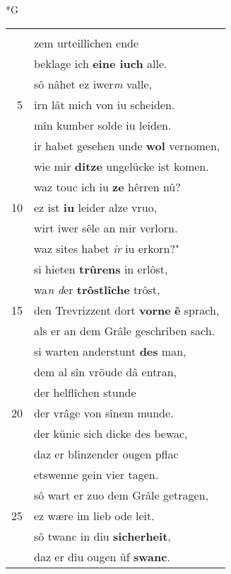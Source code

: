 \documentclass[8pt,a4paper,notitlepage]{article}
\begin{document}
\newpage
\begin{table}[ht]
\begin{minipage}[t]{0.5\linewidth}
\small
\begin{center}*G
\end{center}
\begin{tabular}{rl}
 & \textit{\begin{Large}I\end{Large}}ch vröuden ellende,\\ 
 & zem urteillîchen ende\\ 
 & beklage ich \textbf{eine iuch} alle.\\ 
 & sô nâhet ez iwer\textit{m} valle,\\ 
5 & irn lât mich von iu scheiden.\\ 
 & mîn kumber solde iu leiden.\\ 
 & ir habet gesehen unde \textbf{wol} vernomen,\\ 
 & wie mir \textbf{ditze} ungelücke ist komen.\\ 
 & waz touc ich iu \textbf{ze} hêrren nû?\\ 
10 & ez ist \textbf{iu} leider alze vruo,\\ 
 & wirt iwer sêle an mir verlorn.\\ 
 & waz sites habet \textit{ir} iu erkorn?"\\ 
 & si hieten \textbf{trûrens} in erlôst,\\ 
 & wa\textit{n d}er \textbf{trôstlîche} trôst,\\ 
15 & den Trevrizzent dort \textbf{vorne} \textbf{ê} sprach,\\ 
 & als er an dem Grâle geschriben sach.\\ 
 & si warten anderstunt \textbf{des} man,\\ 
 & dem al sîn vröude dâ entran,\\ 
 & der helflîchen stunde\\ 
20 & der vrâge von sînem munde.\\ 
 & der künic sich dicke des bewac,\\ 
 & daz er blinzender ougen pflac\\ 
 & etswenne gein vier tagen.\\ 
 & sô wart er zuo dem Grâle getragen,\\ 
25 & ez wære im lieb ode leit.\\ 
 & sô twanc in diu \textbf{sicherheit},\\ 
 & daz er diu ougen ûf \textbf{swanc}.\\ 

\end{tabular}
\end{minipage}
\end{table}
\end{document}
